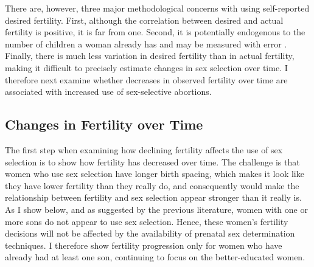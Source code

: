 \documentclass[12pt,letterpaper]{article}
\begin{document}
There are, however, three major methodological concerns with using self-reported 
desired fertility.
First, although the correlation between desired and actual fertility is positive,
it is far from one.
Second, it is potentially endogenous to the number of children a woman already has 
and may be measured with error \citep{Jensen1985,Rasul2008,Ashraf2009}.
Finally, there is much less variation in desired fertility than in actual fertility,
making it difficult to precisely estimate changes in sex selection over time.
I therefore next examine whether decreases in observed fertility over time are
associated with increased use of sex-selective abortions.


\subsection{Changes in Fertility over Time\label{sec:changes}}


The first step when examining how declining fertility affects the use of sex selection is 
to show how fertility has decreased over time.
The challenge is that women who use sex selection have longer birth spacing, which 
makes it look like they have lower fertility than they really do, and consequently would
make the relationship between fertility and sex selection appear stronger than it really is.
As I show below, and as suggested by the previous literature, women with one or more sons 
do not appear to use sex selection.
Hence, these women's fertility decisions will not be affected by the availability
of prenatal sex determination techniques.
I therefore show fertility progression only for women who have already had at least one 
son, continuing to focus on the better-educated women.
\end{document}
